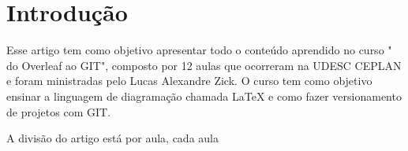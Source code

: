 
\chapter{Introdução}
Esse artigo tem como objetivo apresentar todo o conteúdo aprendido no curso " do Overleaf ao GIT", composto por 12 aulas que ocorreram na UDESC CEPLAN e foram ministradas pelo Lucas Alexandre Zick. O curso tem como objetivo ensinar a linguagem de diagramação chamada LaTeX e como fazer versionamento de projetos com GIT.

A divisão do artigo está por aula, cada aula



